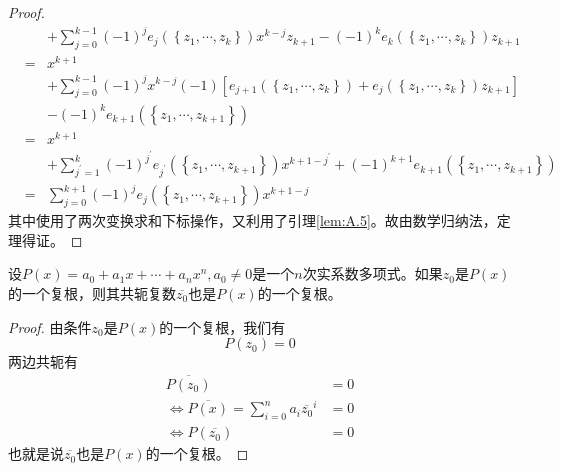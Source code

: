 \documentclass[../main.tex]{subfiles}
\begin{document}
\begin{proof}
\[\begin{array}{rcl}
                                                &   & +\sum_{j=0}^{k-1}\left(-1\right)^j e_j\left(\left\{z_1,\cdots,z_k\right\}\right)x^{k-j}z_{k+1}-\left(-1\right)^ke_k\left(\left\{z_1,\cdots,z_k\right\}\right)z_{k+1}                                \\
                                                & = & x^{k+1}                                                                                                                                                                                             \\
                                                &   & +\sum_{j=0}^{k-1}\left(-1\right)^j x^{k-j}\left(-1\right)\left[e_{j+1}\left(\left\{z_1,\cdots,z_k\right\}\right)+e_j\left(\left\{z_1,\cdots,z_k\right\}\right)z_{k+1}\right]                        \\
                                                &   & -\left(-1\right)^ke_{k+1}\left(\left\{z_1,\cdots,z_{k+1}\right\}\right)                                                                                                                             \\
                                                & = & x^{k+1}                                                                                                                                                                                             \\
                                                &   & +\sum_{j^\prime=1}^k\left(-1\right)^{j^\prime}e_{j^\prime}\left(\left\{z_1,\cdots,z_{k+1}\right\}\right)x^{k+1-j^\prime}+\left(-1\right)^{k+1}e_{k+1}\left(\left\{z_1,\cdots,z_{k+1}\right\}\right) \\
                                                & = & \sum_{j=0}^{k+1}\left(-1\right)^je_j\left(\left\{z_1,\cdots,z_{k+1}\right\}\right)x^{k+1-j}
        \end{array}\]
    其中使用了两次变换求和下标操作，又利用了引理\ref{lem:A.5}。故由数学归纳法，定理得证。
\end{proof}

\begin{theorem}[共轭复根定理]\label{thm:A.8}
    设$P\left(x\right)=a_0+a_1x+\cdots+a_nx^n,a_0\neq 0$是一个$n$次实系数多项式。如果$z_0$是$P\left(x\right)$的一个复根，则其共轭复数$\overline{z_0}$也是$P\left(x\right)$的一个复根。
\end{theorem}
\begin{proof}
    由条件$z_0$是$P\left(x\right)$的一个复根，我们有
    \[P\left(z_0\right)=0\]
    两边共轭有
    \[\begin{aligned}
            \overline{P\left(z_0\right)}                                              & =0 \\
            \Leftrightarrow\overline{P\left(x\right)}=\sum_{i=0}^na_i\overline{z_0}^i & =0 \\
            \Leftrightarrow P\left(\overline{z_0}\right)                              & =0
        \end{aligned}\]
    也就是说$\overline{z_0}$也是$P\left(x\right)$的一个复根。
\end{proof}
\end{document}
